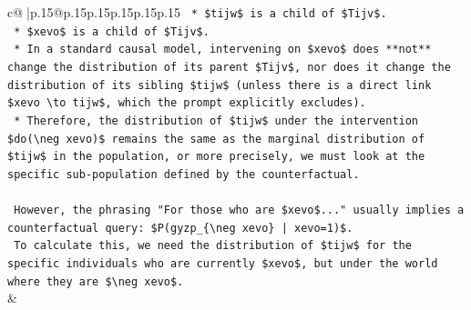 \documentclass{article}
\begin{document}
{\begin{supertabular}{c@{$\;$}|p{.15\linewidth}@{}p{.15\linewidth}p{.15\linewidth}p{.15\linewidth}p{.15\linewidth}p{.15\linewidth}}
{{{\texttt{    *   \$tijw\$ is a child of \$Tijv\$.} \\
\texttt{    *   \$xevo\$ is a child of \$Tijv\$.} \\
\texttt{    *   In a standard causal model, intervening on \$xevo\$ does **not** change the distribution of its parent \$Tijv\$, nor does it change the distribution of its sibling \$tijw\$ (unless there is a direct link \$xevo \textbackslash{}to tijw\$, which the prompt explicitly excludes).} \\
\texttt{    *   Therefore, the distribution of \$tijw\$ under the intervention \$do(\textbackslash{}neg xevo)\$ remains the same as the marginal distribution of \$tijw\$ in the population, or more precisely, we must look at the specific sub{-}population defined by the counterfactual.} \\
\\ 
\texttt{    However, the phrasing "For those who are \$xevo\$..." usually implies a counterfactual query: \$P(gyzp\_\{\textbackslash{}neg xevo\} | xevo=1)\$.} \\
\texttt{    To calculate this, we need the distribution of \$tijw\$ for the specific individuals who are currently \$xevo\$, but under the world where they are \$\textbackslash{}neg xevo\$.} \\
            }
        }
    }
    & \\ \\


\end{supertabular}}
\end{document}
